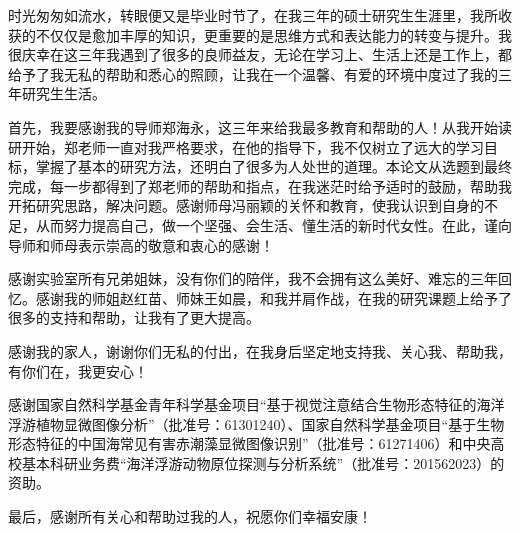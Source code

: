 
\begin{ack}
时光匆匆如流水，转眼便又是毕业时节了，在我三年的硕士研究生生涯里，我所收获的不仅仅是愈加丰厚的知识，更重要的是思维方式和表达能力的转变与提升。我很庆幸在这三年我遇到了很多的良师益友，无论在学习上、生活上还是工作上，都给予了我无私的帮助和悉心的照顾，让我在一个温馨、有爱的环境中度过了我的三年研究生生活。

首先，我要感谢我的导师郑海永，这三年来给我最多教育和帮助的人！从我开始读研开始，郑老师一直对我严格要求，在他的指导下，我不仅树立了远大的学习目标，掌握了基本的研究方法，还明白了很多为人处世的道理。本论文从选题到最终完成，每一步都得到了郑老师的帮助和指点，在我迷茫时给予适时的鼓励，帮助我开拓研究思路，解决问题。感谢师母冯丽颖的关怀和教育，使我认识到自身的不足，从而努力提高自己，做一个坚强、会生活、懂生活的新时代女性。在此，谨向导师和师母表示崇高的敬意和衷心的感谢！

感谢实验室所有兄弟姐妹，没有你们的陪伴，我不会拥有这么美好、难忘的三年回忆。感谢我的师姐赵红苗、师妹王如晨，和我并肩作战，在我的研究课题上给予了很多的支持和帮助，让我有了更大提高。

感谢我的家人，谢谢你们无私的付出，在我身后坚定地支持我、关心我、帮助我，有你们在，我更安心！

感谢国家自然科学基金青年科学基金项目“基于视觉注意结合生物形态特征的海洋浮游植物显微图像分析”（批准号：61301240）、国家自然科学基金项目“基于生物形态特征的中国海常见有害赤潮藻显微图像识别”（批准号：61271406）和中央高校基本科研业务费“海洋浮游动物原位探测与分析系统”（批准号：201562023）的资助。

最后，感谢所有关心和帮助过我的人，祝愿你们幸福安康！
\end{ack}
